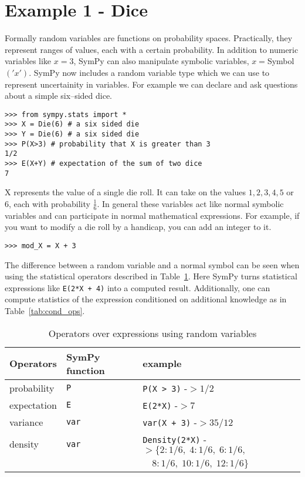 \section{Example 1 - Dice}

Formally random variables are functions on probability spaces.  Practically, they represent ranges of values, each with a certain probability.  In
addition to numeric variables like $x = 3$, SymPy can also manipulate symbolic
variables, $x = $Symbol$('x')$. SymPy now includes a random variable type which
we can use to represent uncertainity in variables.  For example we can declare and ask questions about a simple six--sided dice.

\begin{lstlisting}
>>> from sympy.stats import *
>>> X = Die(6) # a six sided die
>>> Y = Die(6) # a six sided die
>>> P(X>3) # probability that X is greater than 3
1/2
>>> E(X+Y) # expectation of the sum of two dice
7
\end{lstlisting}

X represents the value of a single die roll. It can take on the values
$1,2,3,4,5$ or $6$, each with probability $\frac{1}{6}$. In general these
variables act like normal symbolic variables and can participate in normal
mathematical expressions. For example, if you want to modify a die roll by a
handicap, you can add an integer to it.

\begin{lstlisting}
>>> mod_X = X + 3
\end{lstlisting}

The difference between a random variable and a normal symbol can be seen when
using the statistical operators described in Table~\ref{tab:stat_ops}. 
Here SymPy turns statistical expressions like {\tt E(2*X + 4)} into a computed result. Additionally, one can compute statistics of the expression conditioned on additional knowledge as in Table~\ref{tab:cond_ops}.

\begin{table}[h]
\begin{tabular}{|lll|}
\hline
Operators & SymPy function & example\\ \hline
probability & {\tt P} & {\tt P(X > 3)}  -$> 1/2$\\ \hline
expectation & {\tt E} & {\tt E(2*X)}  -$> 7$ \\ \hline
variance & {\tt var} & {\tt var(X + 3)} -$> 35/12$\\ \hline
density & {\tt var} & {\tt Density(2*X)}  -$> \{2: 1/6,\; 4: 1/6,\; 6: 1/6,$ \\
            & & \phantom{Density(X+3)  -$> \{$ } $\quad 8: 1/6,\; 10: 1/6,\; 12: 1/6\}$ \\ \hline
\end{tabular}
\label{tab:stat_ops}
\caption{Operators over expressions using random variables}
\end{table}

